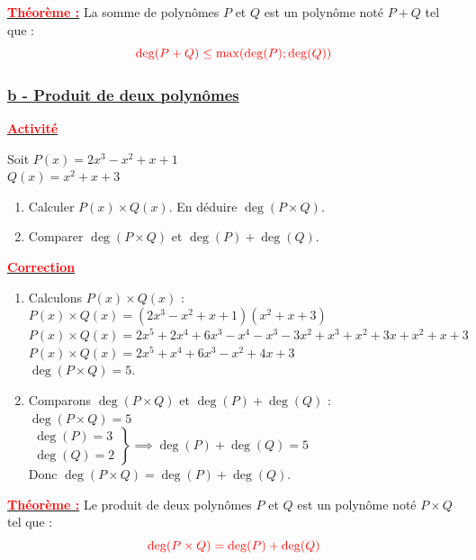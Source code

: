 \documentclass[12pt,a4paper]{article}
\begin{document}
\textbf{\underline{\textcolor{red}{Théorème :}}} La somme de polynômes $P$ et $Q$ est un polynôme noté $P+Q$ tel que :
\[ \textcolor{red}{\deg(P+Q) \leq \max(\deg(P); \deg(Q))} \]

\vspace{0.5cm}

\subsubsection*{%
    \color{red} \underline{b - Produit de deux polynômes}%
}

\textbf{\underline{\textcolor{red}{Activité}}}

Soit $P(x) = 2x^3 - x^2 + x + 1$ \\
$Q(x) = x^2 + x + 3$

\begin{enumerate}
    \item Calculer $P(x) \times Q(x)$. En déduire $\deg(P \times Q)$.
    \item Comparer $\deg(P \times Q)$ et $\deg(P) + \deg(Q)$.
\end{enumerate}

\textbf{\underline{\textcolor{red}{Correction}}}
\begin{enumerate}
    \item Calculons $P(x) \times Q(x)$ : \\
    $P(x) \times Q(x) = (2x^3 - x^2 + x + 1)(x^2 + x + 3)$ \\
    $P(x) \times Q(x) = 2x^5 + 2x^4 + 6x^3 - x^4 - x^3 - 3x^2 + x^3 + x^2 + 3x + x^2 + x + 3$ \\
    $P(x) \times Q(x) = 2x^5 + x^4 + 6x^3 - x^2 + 4x + 3$ \\
    \textbf{$\deg(P \times Q) = 5$}.

    \item Comparons $\deg(P \times Q)$ et $\deg(P) + \deg(Q)$ : \\
    $\deg(P \times Q) = 5$ \\
    $\left. \begin{array}{l} \deg(P) = 3 \\ \deg(Q) = 2 \end{array} \right\} \implies \deg(P) + \deg(Q) = 5$ \\
    Donc \textbf{$\deg(P \times Q) = \deg(P) + \deg(Q)$}.
\end{enumerate}

\textbf{\underline{\textcolor{red}{Théorème :}}} Le produit de deux polynômes $P$ et $Q$ est un polynôme noté $P \times Q$ tel que :
\[ \textcolor{red}{\deg(P \times Q) = \deg(P) + \deg(Q)} \]
\end{document}
